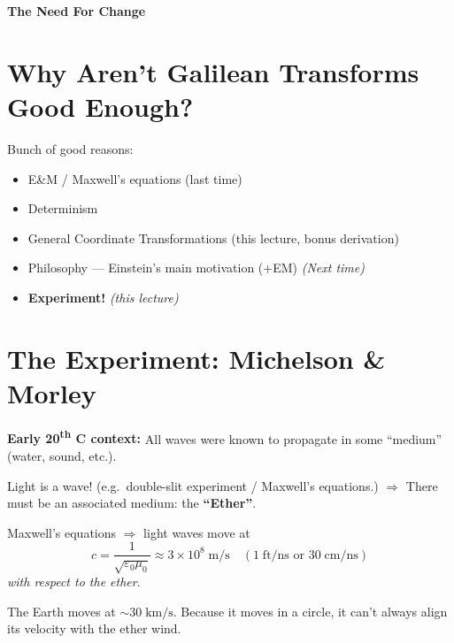 

\usepackage{tikz}
\usetikzlibrary{arrows.meta, decorations.markings}
\usepackage{nicefrac}
\usepackage{amssymb}



\thispagestyle{fancy}

\begin{center}
  {\huge \textbf{The Need For Change}}
\end{center}

\section*{Why Aren't Galilean Transforms Good Enough?}

Bunch of good reasons:
\begin{itemize}
  \item E\&M / Maxwell's equations (last time) \checkmark
  \item Determinism \checkmark
  \item General Coordinate Transformations (this lecture, bonus derivation)
  \item Philosophy --- Einstein's main motivation (+EM) \hfill \textit{(Next time)}
  \item \textbf{Experiment!} \hfill \textit{(this lecture)}
\end{itemize}

\section*{The Experiment: Michelson \& Morley}

\textbf{Early 20\textsuperscript{th} C context:} All waves were known to propagate in some
``medium'' (water, sound, etc.).

Light is a wave! (e.g.\ double-slit experiment / Maxwell's equations.)
$\Rightarrow$ There must be an associated medium: the \textbf{``Ether''}.

Maxwell's equations $\Rightarrow$ light waves move at
\[
  c = \frac{1}{\sqrt{\varepsilon_0 \mu_0}} \approx 3\times10^8\;\text{m/s}
  \quad (1\;\text{ft/ns} \text{ or } 30\;\text{cm/ns})
\]
\emph{with respect to the ether}.

The Earth moves at $\sim 30\;\text{km/s}$. Because it moves in a circle, it
can't always align its velocity with the ether wind.

